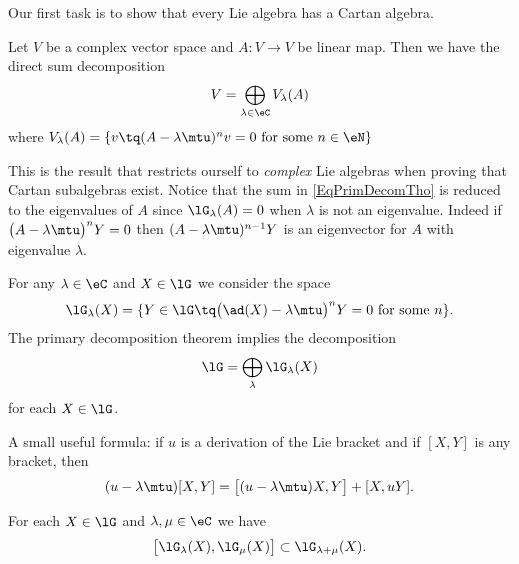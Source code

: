 Our first task is to show that every Lie algebra has a Cartan algebra.

\begin{lemma}
	Let \( V\) be a complex vector space and \( A\colon V\to V\) be linear map. Then we have the direct sum decomposition
	\begin{equation}        \label{EqPrimDecomTho}
		V=\bigoplus_{\lambda\in\eC}V_{\lambda}(A)
	\end{equation}
	where \( V_{\lambda}(A)=\{ v\tq (A-\lambda\mtu)^nv=0\text{ for some } n\in\eN \} \)
\end{lemma}
This is the result that restricts ourself to \emph{complex} Lie algebras when proving that Cartan subalgebras exist. Notice that the sum in \eqref{EqPrimDecomTho} is reduced to the eigenvalues of \( A\) since \( \lG_{\lambda}(A)=0\) when \( \lambda\) is not an eigenvalue. Indeed if \( \big( A-\lambda\mtu \big)^nY=0\) then \( (A-\lambda\mtu)^{n-1}Y\) is an eigenvector for \( A\) with eigenvalue \( \lambda\).

For any \( \lambda\in\eC\) and \( X\in\lG\) we consider the space
\begin{equation}
	\lG_{\lambda}(X)=\{ Y\in\lG\tq \big( \ad(X)-\lambda\mtu \big)^nY=0\text{ for some } n \}.
\end{equation}
The primary decomposition theorem implies the decomposition
\begin{equation}        \label{EqDecomplGpRimDecombijk}
	\lG=\bigoplus_{\lambda}\lG_{\lambda}(X)
\end{equation}
for each \( X\in\lG\).

A small useful formula: if \( u\) is a derivation of the Lie bracket and if \( [X,Y]\) is any bracket, then
\begin{equation}\label{EqWGujmeF}
	(u-\lambda\mtu)[X,Y]=\big[ (u-\lambda\mtu)X,Y \big]+[X,uY].
\end{equation}

\begin{lemma}   \label{LemVZzSnUW}
	For each \( X\in\lG\) and \( \lambda,\mu\in\eC\) we have
	\begin{equation}
		\big[ \lG_{\lambda}(X),\lG_{\mu}(X) \big]\subset\lG_{\lambda+\mu}(X).
	\end{equation}
\end{lemma}

